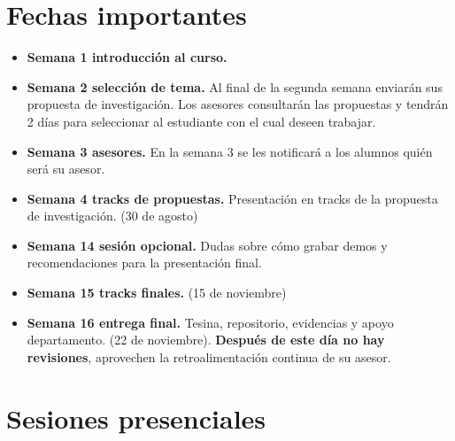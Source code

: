 \documentclass[letterpaper, 10 pt, conference]{ieeeconf}  %
\begin{document}
\section{Fechas importantes}
\begin{itemize}
	\item	\textbf{Semana 1 introducción al curso.} 
        \item	\textbf{Semana 2 selección de tema.} Al final de la segunda semana enviarán sus propuesta de investigación. Los asesores consultarán las propuestas y tendrán 2 días para seleccionar al estudiante con el cual deseen trabajar.
        \item	\textbf{Semana 3 asesores.} En la semana 3 se les notificará a los alumnos quién será su asesor.
        \item	\textbf{Semana 4 tracks de propuestas.} Presentación en tracks de la propuesta de investigación. (30 de agosto)
        \item	\textbf{Semana 14 sesión opcional.} Dudas sobre cómo grabar demos y recomendaciones para la presentación final. 
        \item	\textbf{Semana 15 tracks finales.} (15 de noviembre)
	   \item	\textbf{Semana 16 entrega final.} Tesina, repositorio, evidencias y apoyo departamento. (22 de noviembre). \textbf{Después de este día no hay revisiones}, aprovechen la retroalimentación continua de su asesor.
\end{itemize}

\section{Sesiones presenciales}
\end{document}
